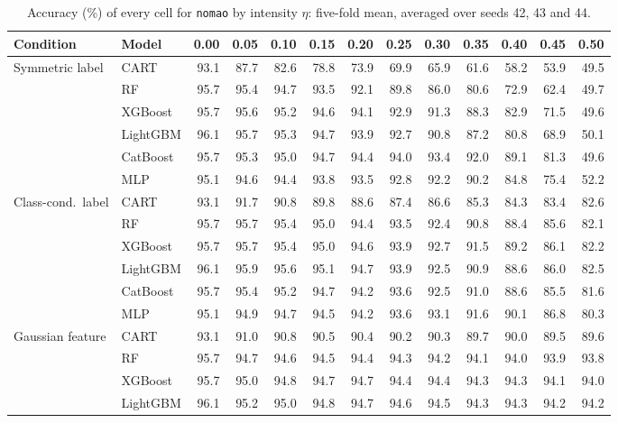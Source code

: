 \begin{table}[p]
\centering
\tiny
\setlength{\tabcolsep}{2.6pt}
\caption{Accuracy (\%) of every cell for \texttt{nomao} by intensity $\eta$: five-fold mean, averaged over seeds 42, 43 and 44.}
\label{tab:grid_nomao}
\begin{tabular}{@{}llrrrrrrrrrrr@{}}
\toprule
Condition & Model & 0.00 & 0.05 & 0.10 & 0.15 & 0.20 & 0.25 & 0.30 & 0.35 & 0.40 & 0.45 & 0.50 \\
\midrule
Symmetric label & CART & 93.1 & 87.7 & 82.6 & 78.8 & 73.9 & 69.9 & 65.9 & 61.6 & 58.2 & 53.9 & 49.5 \\
 & RF & 95.7 & 95.4 & 94.7 & 93.5 & 92.1 & 89.8 & 86.0 & 80.6 & 72.9 & 62.4 & 49.7 \\
 & XGBoost & 95.7 & 95.6 & 95.2 & 94.6 & 94.1 & 92.9 & 91.3 & 88.3 & 82.9 & 71.5 & 49.6 \\
 & LightGBM & 96.1 & 95.7 & 95.3 & 94.7 & 93.9 & 92.7 & 90.8 & 87.2 & 80.8 & 68.9 & 50.1 \\
 & CatBoost & 95.7 & 95.3 & 95.0 & 94.7 & 94.4 & 94.0 & 93.4 & 92.0 & 89.1 & 81.3 & 49.6 \\
 & MLP & 95.1 & 94.6 & 94.4 & 93.8 & 93.5 & 92.8 & 92.2 & 90.2 & 84.8 & 75.4 & 52.2 \\
\midrule
Class-cond.\ label & CART & 93.1 & 91.7 & 90.8 & 89.8 & 88.6 & 87.4 & 86.6 & 85.3 & 84.3 & 83.4 & 82.6 \\
 & RF & 95.7 & 95.7 & 95.4 & 95.0 & 94.4 & 93.5 & 92.4 & 90.8 & 88.4 & 85.6 & 82.1 \\
 & XGBoost & 95.7 & 95.7 & 95.4 & 95.0 & 94.6 & 93.9 & 92.7 & 91.5 & 89.2 & 86.1 & 82.2 \\
 & LightGBM & 96.1 & 95.9 & 95.6 & 95.1 & 94.7 & 93.9 & 92.5 & 90.9 & 88.6 & 86.0 & 82.5 \\
 & CatBoost & 95.7 & 95.4 & 95.2 & 94.7 & 94.2 & 93.6 & 92.5 & 91.0 & 88.6 & 85.5 & 81.6 \\
 & MLP & 95.1 & 94.9 & 94.7 & 94.5 & 94.2 & 93.6 & 93.1 & 91.6 & 90.1 & 86.8 & 80.3 \\
\midrule
Gaussian feature & CART & 93.1 & 91.0 & 90.8 & 90.5 & 90.4 & 90.2 & 90.3 & 89.7 & 90.0 & 89.5 & 89.6 \\
 & RF & 95.7 & 94.7 & 94.6 & 94.5 & 94.4 & 94.3 & 94.2 & 94.1 & 94.0 & 93.9 & 93.8 \\
 & XGBoost & 95.7 & 95.0 & 94.8 & 94.7 & 94.7 & 94.4 & 94.4 & 94.3 & 94.3 & 94.1 & 94.0 \\
 & LightGBM & 96.1 & 95.2 & 95.0 & 94.8 & 94.7 & 94.6 & 94.5 & 94.3 & 94.3 & 94.2 & 94.2 \\

\end{tabular}
\end{table}
